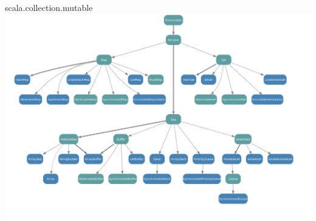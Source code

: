 \begin{Slide}{scala.collection.mutable}
\includegraphics[width=1.05\textwidth]{../img/collection/collection-mutable}
\end{Slide}





